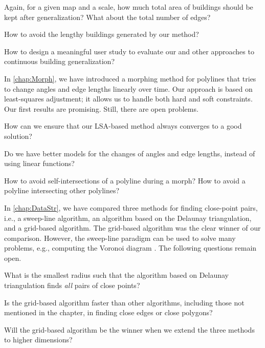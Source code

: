 \begin{open}
  Again, for a given map and a scale, 
  how much total area of buildings should be kept 
  after generalization? 
  What about the total number of edges?
\end{open}

\begin{open}
  How to avoid the lengthy buildings generated by our method?
\end{open}

\begin{open}
  How to design a meaningful user study 
  to evaluate our and other approaches 
  to continuous building generalization?
\end{open}

In \chap\ref{chap:Morph}, 
we have introduced a morphing method for polylines 
that tries to change angles and edge lengths linearly over time. 
Our approach is based on least-squares adjustment;
it allows us to handle both hard and soft constraints. 
Our first results are promising. 
Still, there are open problems. 

\begin{open}
  How can we ensure that our LSA-based method always 
  converges to a good solution?
\end{open}

\begin{open}
  Do we have better models for the changes of 
  angles and edge lengths, instead of using linear functions?
\end{open}

\begin{open}
  How to avoid self-intersections of a polyline during a morph?
  How to avoid a polyline intersecting other polylines?
\end{open}

In \chap\ref{chap:DataStr}, we have compared three methods
for finding close-point pairs, i.e., a sweep-line algorithm, 
an algorithm based on the Delaunay triangulation, 
and a grid-based algorithm.
The grid-based algorithm was 
the clear winner of our comparison.
However, the sweep-line paradigm 
can be used to solve many problems,
e.g., computing the Voronoi diagram 
\parencite{Fortune1987Voronoi}.
The following questions remain open.

\begin{open}
  What is the smallest radius such that 
  the algorithm based on Delaunay triangulation
  finds \emph{all} pairs of close points?
\end{open}

\begin{open}
  Is the grid-based algorithm faster than other algorithms, 
  including those not mentioned in the chapter, 
  in finding close edges or close polygons?
\end{open}

\begin{open}
  Will the grid-based algorithm be the winner
  when we extend the three methods to higher dimensions?
\end{open}